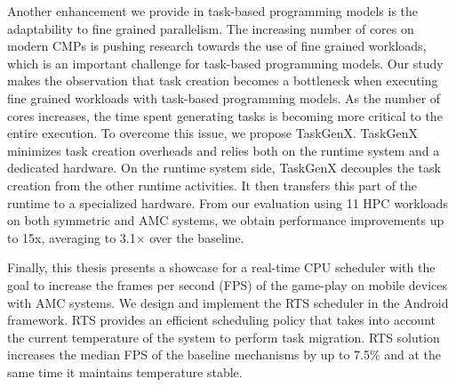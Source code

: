 Another enhancement we provide in task-based programming models is the adaptability to fine grained parallelism. The increasing number of cores on modern CMPs is pushing research towards the use of fine grained workloads, which is an important challenge for task-based programming models. Our study makes the observation that task creation becomes a bottleneck when executing fine grained workloads with task-based programming models. As the number of cores increases, the time spent generating tasks is becoming more critical to the entire execution. To overcome this issue, we propose TaskGenX. TaskGenX minimizes task creation overheads and relies both on the runtime system and a dedicated hardware. On the runtime system side, TaskGenX decouples the task creation from the other runtime activities. It then transfers this part of the runtime to a specialized hardware. From our evaluation using 11 HPC workloads on both symmetric and AMC systems, we obtain performance improvements up to 15x, averaging to 3.1$\times$ over the baseline.

Finally, this thesis presents a showcase for a real-time CPU scheduler with the goal to increase the frames per second (FPS) of the game-play on mobile devices with AMC systems. We design and implement the RTS scheduler in the Android framework. RTS provides an efficient scheduling policy that takes into account the current temperature of the system to perform task migration. RTS solution increases the median FPS of the baseline mechanisms by up to 7.5\% and at the same time it maintains temperature stable.